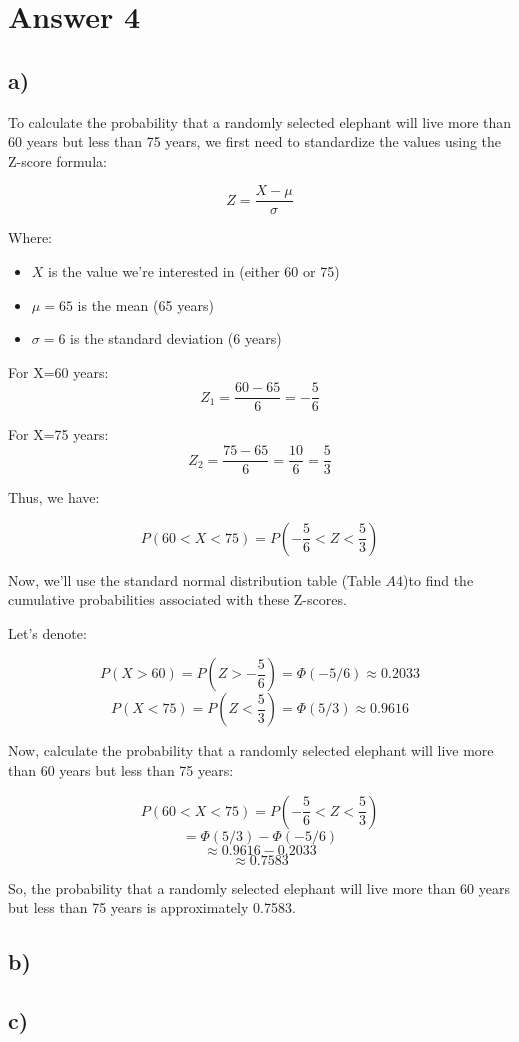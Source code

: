 \documentclass[12pt]{article}
\begin{document}
\section*{Answer 4}
\subsection*{a)} 

To calculate the probability that a randomly selected elephant will live more than 60 years but less than 75 years, we first need to standardize the values using the Z-score formula:

\[ Z = \frac{{X - \mu}}{{\sigma}} \]

Where:

\begin{itemize}
    \item \( X \) is the value we're interested in (either 60 or 75)
    \item \( \mu = 65\) is the mean (65 years)
    \item \( \sigma = 6\) is the standard deviation (6 years)
\end{itemize}

For X=60 years:
\[ Z_1 = \frac{{60 - 65}}{{6}} = -\frac{5}{6} \]

For X=75 years:
\[ Z_2 = \frac{{75 - 65}}{{6}} = \frac{10}{6} = \frac{5}{3} \]

Thus, we have:

\[ P(60 < X < 75) = P(-\frac{5}{6} < Z < \frac{5}{3}) \]

Now, we'll use the standard normal distribution table (Table \(A4\))to find the cumulative probabilities associated with these Z-scores.

Let's denote:

\[ P(X > 60) = P(Z > -\frac{5}{6}) =  \Phi(-5/6) \approx 0.2033 \]
\[ P(X < 75) = P(Z < \frac{5}{3}) =  \Phi(5/3) \approx 0.9616 \]

Now, calculate the probability that a randomly selected elephant will live more than 60 years but less than 75 years:

\[ P(60 < X < 75) = P(-\frac{5}{6} < Z < \frac{5}{3}) \]
\[ = \Phi(5/3) - \Phi(-5/6)\]
\[ \approx 0.9616 - 0.2033\]
\[ \approx 0.7583 \]

So, the probability that a randomly selected elephant will live more than 60 years but less than 75 years is approximately 0.7583.


\subsection*{b)} 

\subsection*{c)} 
\end{document}
